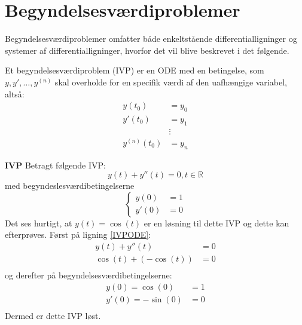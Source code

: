 \section{Begyndelsesværdiproblemer}
Begyndelsesværdiproblemer omfatter både enkeltstående differentialligninger og systemer af differentialligninger, hvorfor det vil blive beskrevet i det følgende.
\begin{definition}
Et begyndelsesværdiproblem (IVP) er en ODE med en betingelse, som $y, y',\hdots, y^{(n)}$ skal overholde for en specifik værdi af den uafhængige variabel, altså:
\begin{align*}
    y(t_0) &= y_0 \\
    y'(t_0) &= y_1 \\
    &\vdots \\
    y^{(n)}(t_0) &= y_n
\end{align*}
\end{definition}

\begin{Example}\textbf{IVP}\hfill \break
\textnormal{Betragt følgende IVP:}
\hfill \break
\begin{equation}\label{IVPODE}
    y(t)+y''(t)=0, t \in \mathbb{R}
\end{equation}
\textnormal{med begyndeslesværdibetingelserne}
\begin{equation*}
    \begin{cases}
    y(0)&=1\\
    y'(0)&=0
    \end{cases}
\end{equation*}
\hfill \break
\textnormal{Det ses hurtigt, at $y(t)=\cos(t)$ er en løsning til dette IVP og dette kan efterprøves. Først på ligning \eqref{IVPODE}:}
\begin{align*}
    y(t)+y''(t)&=0 \\
    \cos(t)+(-\cos(t))&=0 \\ 
\end{align*}
\textnormal{og derefter på begyndelsesværdibetingelserne:}
\begin{align*}
      y(0)=\cos(0)&=1\\
    y'(0)=-\sin(0)&=0\\
\end{align*}
\textnormal{Dermed er dette IVP løst.}
\end{Example}

